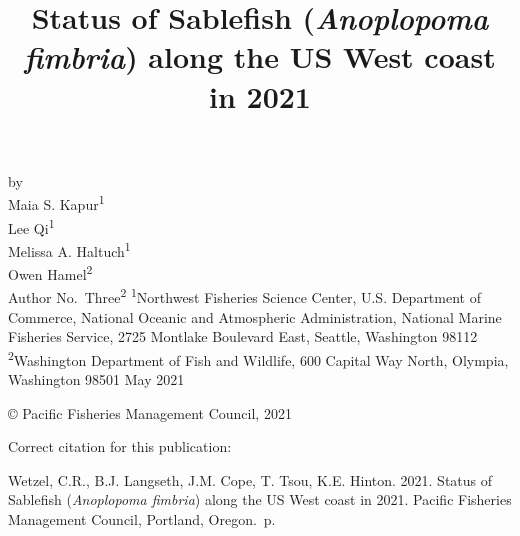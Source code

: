 \documentclass[11pt,
  english,
  a4paper,
]{article}
\date{}
\newcommand{\trTitle}{Status of Sablefish (\emph{Anoplopoma fimbria}) along the US West coast in 2021}
\newcommand{\trYear}{2021}
\newcommand{\trMonth}{May}
\newcommand{\trAuthsBack}{Wetzel, C.R., B.J. Langseth, J.M. Cope, T. Tsou, K.E. Hinton}
\newcommand{\trCitation}{
\begin{hangparas}{1em}{1}
\trAuthsBack{}. \trYear{}. \trTitle{}. Pacific Fisheries Management Council, Portland, Oregon. \pageref{LastPage}{}\,p.
\end{hangparas}}
\begin{document}

\renewcommand*{\thefootnote}{\fnsymbol{footnote}}

\small
\thispagestyle{empty}
\noindent
\begin{center}
\title{Status of Sablefish (\emph{Anoplopoma fimbria}) along the US West coast in 2021}
\vspace{1.5cm}
{\Large\textbf{}}
\vfill
by\\
Maia S. Kapur\textsuperscript{1}\\
Lee Qi\textsuperscript{1}\\
Melissa A. Haltuch\textsuperscript{1}\\
Owen Hamel\textsuperscript{2}\\
Author No.~Three\textsuperscript{2}\vfill
\textsuperscript{1}Northwest Fisheries Science Center, U.S. Department of Commerce, National Oceanic and Atmospheric Administration, National Marine Fisheries Service, 2725 Montlake Boulevard East, Seattle, Washington 98112\\
\textsuperscript{2}Washington Department of Fish and Wildlife, 600 Capital Way North, Olympia, Washington 98501\vfill
\trMonth{} \trYear{}
\end{center}
\clearpage

\thispagestyle{empty}
\vspace*{\fill}
\begin{center}
\copyright{} Pacific Fisheries Management Council, \trYear{}\\
\end{center}
\par
\bigskip
\noindent
Correct citation for this publication:
\bigskip
\par
\trCitation{}
\clearpage


\tableofcontents\clearpage
\listoffigures \listoftables \clearpage
\label{TRlastRoman}
\clearpage

\newpage
\thispagestyle{empty} %

\pagestyle{plain}  %
\renewcommand*{\thefootnote}{\arabic{footnote}}  %
\setcounter{footnote}{0}  %
\renewcommand{\headrulewidth}{0.5pt}
\renewcommand{\footrulewidth}{0.5pt}
\end{document}
